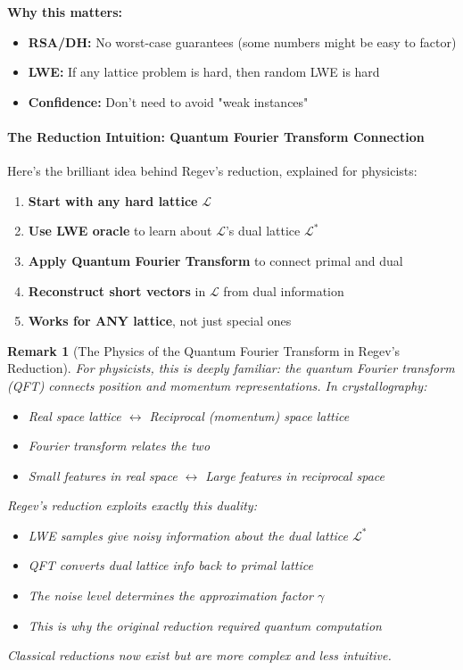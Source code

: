 \documentclass[11pt,a4paper]{article}
\newtheorem{remark}{Remark}
\begin{document}
\textbf{Why this matters:}
\begin{itemize}
    \item \textbf{RSA/DH:} No worst-case guarantees (some numbers might be easy to factor)
    \item \textbf{LWE:} If any lattice problem is hard, then random LWE is hard
    \item \textbf{Confidence:} Don't need to avoid "weak instances"
\end{itemize}

\paragraph{The Reduction Intuition: Quantum Fourier Transform Connection}

Here's the brilliant idea behind Regev's reduction, explained for physicists:

\begin{enumerate}
    \item \textbf{Start with any hard lattice} $\mathcal{L}$
    \item \textbf{Use LWE oracle} to learn about $\mathcal{L}$'s dual lattice $\mathcal{L}^*$
    \item \textbf{Apply Quantum Fourier Transform} to connect primal and dual
    \item \textbf{Reconstruct short vectors} in $\mathcal{L}$ from dual information
    \item \textbf{Works for ANY lattice}, not just special ones
\end{enumerate}

\begin{remark}[The Physics of the Quantum Fourier Transform in Regev's Reduction]
For physicists, this is deeply familiar: the quantum Fourier transform (QFT) connects position and momentum representations. In crystallography:
\begin{itemize}
    \item Real space lattice $\leftrightarrow$ Reciprocal (momentum) space lattice
    \item Fourier transform relates the two
    \item Small features in real space $\leftrightarrow$ Large features in reciprocal space
\end{itemize}

Regev's reduction exploits exactly this duality:
\begin{itemize}
    \item LWE samples give noisy information about the dual lattice $\mathcal{L}^*$
    \item QFT converts dual lattice info back to primal lattice
    \item The noise level determines the approximation factor $\gamma$
    \item This is why the original reduction required quantum computation
\end{itemize}

Classical reductions now exist but are more complex and less intuitive.
\end{remark}
\end{document}
